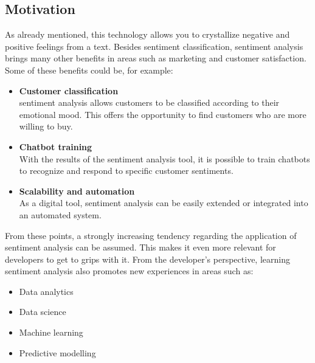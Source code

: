\subsection{Motivation}
As already mentioned, this technology allows you to crystallize negative and positive feelings from a text. Besides sentiment classification, sentiment analysis brings many other benefits in areas such as marketing and customer satisfaction. Some of these benefits could be, for example:

\begin{itemize}
\item \textbf{Customer classification}\\
sentiment analysis allows customers to be classified according to their emotional mood. This offers the opportunity to find customers who are more willing to buy.
\item \textbf{Chatbot training}\\
With the results of the sentiment analysis tool, it is possible to train chatbots to recognize and respond to specific customer sentiments.
\item \textbf{Scalability and automation}\\
As a digital tool, sentiment analysis can be easily extended or integrated into an automated system.
\end{itemize}

From these points, a strongly increasing tendency regarding the application of sentiment analysis can be assumed. This makes it even more relevant for developers to get to grips with it. From the developer's perspective, learning sentiment analysis also promotes new experiences in areas such as: 

\begin{itemize}
\item Data analytics
\item Data science
\item Machine learning
\item Predictive modelling
\end{itemize}

